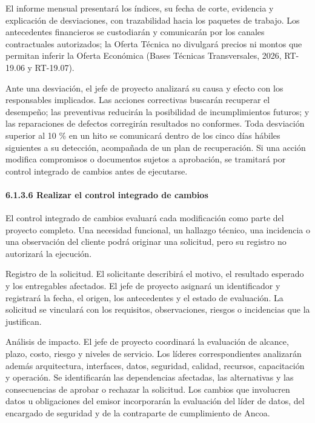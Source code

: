 \documentclass[11pt]{article}
\begin{document}
El informe mensual presentará los índices, su fecha de corte, evidencia
y explicación de desviaciones, con trazabilidad hacia los paquetes de
trabajo. Los antecedentes financieros se custodiarán y comunicarán por
los canales contractuales autorizados; la Oferta Técnica no divulgará
precios ni montos que permitan inferir la Oferta Económica (Bases
Técnicas Transversales, 2026, RT-19.06 y RT-19.07).

Ante una desviación, el jefe de proyecto analizará su causa y efecto con
los responsables implicados. Las acciones correctivas buscarán recuperar
el desempeño; las preventivas reducirán la posibilidad de
incumplimientos futuros; y las reparaciones de defectos corregirán
resultados no conformes. Toda desviación superior al 10 \% en un hito se
comunicará dentro de los cinco días hábiles siguientes a su detección,
acompañada de un plan de recuperación. Si una acción modifica
compromisos o documentos sujetos a aprobación, se tramitará por control
integrado de cambios antes de ejecutarse.

\paragraph{6.1.3.6 Realizar el control integrado de cambios}\label{6-1-3-6-realizar-el-control-integrado-de-cambios}

El control integrado de cambios evaluará cada modificación como parte del proyecto completo. Una necesidad funcional, un hallazgo técnico, una incidencia o una observación del cliente podrá originar una solicitud, pero su registro no autorizará la ejecución.

Registro de la solicitud. El solicitante describirá el motivo, el
resultado esperado y los entregables afectados. El jefe de proyecto
asignará un identificador y registrará la fecha, el origen, los
antecedentes y el estado de evaluación. La solicitud se vinculará con
los requisitos, observaciones, riesgos o incidencias que la justifican.

Análisis de impacto. El jefe de proyecto coordinará la evaluación de
alcance, plazo, costo, riesgo y niveles de servicio. Los líderes
correspondientes analizarán además arquitectura, interfaces, datos,
seguridad, calidad, recursos, capacitación y operación. Se identificarán
las dependencias afectadas, las alternativas y las consecuencias de
aprobar o rechazar la solicitud. Los cambios que involucren datos u
obligaciones del emisor incorporarán la evaluación del líder de datos,
del encargado de seguridad y de la contraparte de cumplimiento de Ancoa.
\end{document}
